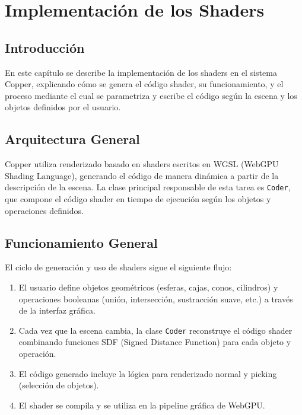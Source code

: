 \chapter{Implementación de los Shaders}

\section{Introducción}

En este capítulo se describe la implementación de los shaders en el sistema
Copper, explicando cómo se genera el código shader, su funcionamiento, y el
proceso mediante el cual se parametriza y escribe el código según la escena y
los objetos definidos por el usuario.

\section{Arquitectura General}

Copper utiliza renderizado basado en shaders escritos en WGSL (WebGPU Shading
Language), generando el código de manera dinámica a partir de la descripción de
la escena. La clase principal responsable de esta tarea es \texttt{Coder}, que
compone el código shader en tiempo de ejecución según los objetos y operaciones
definidos.

\section{Funcionamiento General}

El ciclo de generación y uso de shaders sigue el siguiente flujo:

\begin{enumerate}
    \item El usuario define objetos geométricos (esferas, cajas, conos, cilindros) y
          operaciones booleanas (unión, intersección, sustracción suave, etc.) a través
          de la interfaz gráfica.
    \item Cada vez que la escena cambia, la clase \texttt{Coder} reconstruye el código
          shader combinando funciones SDF (Signed Distance Function) para cada objeto y
          operación.
    \item El código generado incluye la lógica para renderizado normal y picking
          (selección de objetos).
    \item El shader se compila y se utiliza en la pipeline gráfica de WebGPU.
\end{enumerate}

